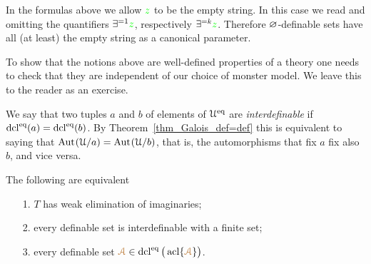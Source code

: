 \documentclass[creche.tex]{subfiles}
\begin{document}
In the formulas above we allow ${\color{green} z}$ to be the empty string.
In this case we read  and  omitting the quantifiers $\exists^{=1}{\color{green} z}$, respectively $\exists^{=k}{\color{green} z}$.
Therefore $\varnothing$-definable sets have all (at least) the empty string as a canonical parameter.

To show that the notions above are well-defined properties of a theory one needs to check that they are independent of our choice of monster model.
We leave this to the reader as an exercise.

We say that two tuples $a$ and $b$ of elements of $\EuScript U^{{\rm eq}}$ are \emph{interdefinable\/} if $\mathop{\rm dcl}^{{\rm eq}}(a)=\mathop{\rm dcl}^{{\rm eq}}(b)$.
By Theorem~\ref{thm_Galois_def=def} this is equivalent to saying that ${\rm Aut\kern.15ex}(\EuScript U/a)={\rm Aut\kern.15ex}(\EuScript U/b)$, that is, the automorphisms that fix $a$ fix also $b$, and vice versa.

\begin{theorem}\label{thm_elimimd}
The following are equivalent
\begin{itemize}
\item[1.] $T$ has weak elimination of imaginaries;
\item[2.] every definable set is interdefinable with a finite set;
\item[3.] every definable set ${\color{brown}\EuScript A}\in\mathop{\rm dcl}^{{\rm eq}}\big(\mathop{\rm acl}\{{\color{brown}\EuScript A}\}\big)$.
\end{itemize}
\end{theorem}

\end{document}
